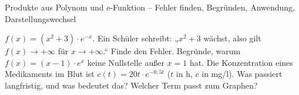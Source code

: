 \begin{aufgabe}{Produkte aus Polynom und e-Funktion – Fehler finden, Begründen, Anwendung, Darstellungswechsel}
\begin{teile}
\teil $f(x) = (x^2 + 3) \cdot e^{-x}$. Ein Schüler schreibt: „$x^2 + 3$ wächst, also gilt $f(x) \to +\infty$ für $x \to +\infty$.“ Finde den Fehler.
\teil Begründe, warum $f(x) = (x - 1) \cdot e^{x}$ keine Nullstelle außer $x = 1$ hat.
\teil Die Konzentration eines Medikaments im Blut ist $c(t) = 20t \cdot e^{-0{,}5t}$ ($t$ in h, $c$ in mg/l). Was passiert langfristig, und was bedeutet das?
\teil Welcher Term passt zum Graphen?  \\  \\ 

\begin{ksys}[xmin=-4,xmax=2,ymin=-2,ymax=3,ablesen]  \end{ksys}
\end{teile}
\end{aufgabe}
